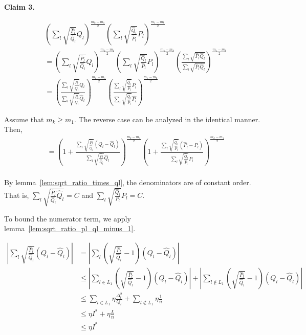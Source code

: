 \documentclass{article}
\begin{document}
\textbf{Claim 3.} 

\begin{align*}
& \left( \sum_l \sqrt{\frac{\hat{P}_l}{\hat{Q}_l}} Q_l \right)^{\frac{m_k - m_1}{2}} 
 \left( \sum_l \sqrt{\frac{\hat{Q}_l}{\hat{P}_l}} P_l \right)^{\frac{m_1 - m_k}{2}} \\
&= \left( \sum_l \sqrt{\frac{\hat{P}_l}{\hat{Q}_l}} Q_l \right)^{\frac{m_k - m_1}{2}} 
 \left( \sum_l \sqrt{\frac{\hat{Q}_l}{\hat{P}_l}} P_l \right)^{\frac{m_1 - m_k}{2}} 
   \left( \frac{\sum_l \sqrt{\hat{P}_l \hat{Q}_l}}{\sum_l \sqrt{\hat{P}_l \hat{Q}_l}} \right)^{\frac{m_1 - m_k}{2}} \\
&=  \left( 
   \frac{\sum_l \sqrt{\frac{\hat{P}_l}{\hat{Q}_l}} Q_l}
        {\sum_l \sqrt{\frac{\hat{P}_l}{\hat{Q}_l}} \hat{Q}_l} 
     \right)^{\frac{m_k - m_1}{2}} 
   \left( \frac{\sum_l \sqrt{\frac{\hat{Q}_l}{\hat{P}_l}} P_l}
         {\sum_l \sqrt{\frac{\hat{Q}_l}{\hat{P}_l}} \hat{P_l} } \right)^{\frac{m_1 - m_k}{2}} 
\end{align*}

Assume that $m_k \geq m_1$. The reverse case can be analyzed in the identical manner. Then,
\begin{align*}
&= \left( 1 + 
   \frac{\sum_l \sqrt{\frac{\hat{P}_l}{\hat{Q}_l}} (Q_l - \hat{Q}_l)}
        {\sum_l \sqrt{\frac{\hat{P}_l}{\hat{Q}_l}} \hat{Q}_l} 
     \right)^{\frac{m_k - m_1}{2}} 
   \left( 1+ \frac{\sum_l \sqrt{\frac{\hat{Q}_l}{\hat{P}_l}} (\hat{P}_l - P_l)}
         {\sum_l \sqrt{\frac{\hat{Q}_l}{\hat{P}_l}} P_l } \right)^{\frac{m_k - m_1}{2}} 
   \\
\end{align*}

By lemma~\ref{lem:sqrt_ratio_times_ql}, the denominators are of constant order. That is, 
$\sum_l \sqrt{ \frac{ \hat{P}_l }{ \hat{Q}_l } \hat{Q}_l } = C$ and 
$\sum_l \sqrt{ \frac{\hat{Q}_l}{P_l} } P_l = C$. 

To bound the numerator term, we apply lemma~\ref{lem:sqrt_ratio_pl_ql_minus_1}. 

\begin{align*}
\left| \sum_l \sqrt{\frac{\hat{P}_l}{\hat{Q}_l}} (Q_l - \hat{Q}_l) \right|  &= 
  \left|  \sum_l \left( \sqrt{\frac{\hat{P}_l}{\hat{Q}_l}} -1 \right) (Q_l - \hat{Q}_l) 
 \right| \\
& \leq \left| \sum_{l \in L_1} \left( \sqrt{\frac{\hat{P}_l}{\hat{Q}_l}} -1 \right) (Q_l - \hat{Q}_l) \right| +  %
  \left| \sum_{l \notin L_1} \left( \sqrt{\frac{\hat{P}_l}{\hat{Q}_l}} -1 \right) (Q_l - \hat{Q}_l) \right| \\
& \leq \sum_{l \in L_1} \eta \frac{\Delta_l^2}{Q_l} + \sum_{l \notin L_1} \eta \frac{1}{n} \\
& \leq \eta I^* + \eta \frac{L}{n}  \\
& \leq \eta I^*  
\end{align*}
\end{document}
